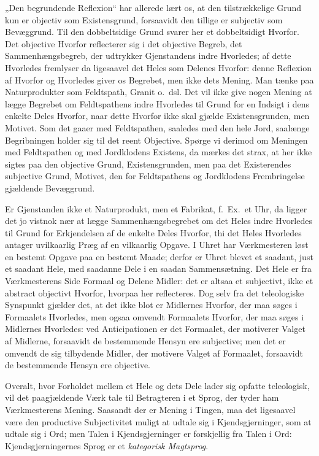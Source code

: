 \documentclass[12pt]{book}
\newcommand{\opage}[1]{\marginnote{\footnotesize\textit{[#1]}}}
\begin{document}
„Den begrundende Reflexion“ har allerede lært os, at den
tilstrækkelige Grund kun er objectiv som Existensgrund, forsaavidt
den tillige er subjectiv som Bevæggrund. Til den
dobbeltsidige Grund svarer her et dobbeltsidigt Hvorfor. Det
objective Hvorfor reflecterer sig i det objective Begreb, det
Sammenhængsbegreb, der udtrykker Gjenstandens indre Hvorledes;
af dette Hvorledes fremlyser da ligesaavel det Heles
som Delenes Hvorfor: denne Reflexion af Hvorfor og Hvorledes
giver os Begrebet, men ikke dets Mening. Man tænke
paa Naturprodukter som Feldtspath, Granit o.\ dsl. Det vil
ikke give nogen Mening at lægge Begrebet om Feldtspathens
indre Hvorledes til Grund for en Indsigt i dens enkelte Deles
Hvorfor, naar dette Hvorfor ikke skal gjælde Existensgrunden,
men Motivet. Som det gaaer med Feldtspathen, saaledes
med den hele Jord, saalænge Begribningen holder sig til det
reent Objective. Spørge vi derimod om Meningen med
Feldtspathen og med Jordklodens Existens, da mærkes det
strax, at her ikke sigtes paa den objective Grund, Existensgrunden,
men paa det Existerendes subjective Grund, Motivet,
den for Feldtspathens og Jordklodens Frembringelse gjældende
Bevæggrund.

Er Gjenstanden ikke et Naturprodukt, men et Fabrikat,
\opage{170}f.\ Ex.\ et Uhr, da ligger det jo vistnok nær at lægge Sammenhængsbegrebet
om det Heles indre Hvorledes til Grund for
Erkjendelsen af de enkelte Deles Hvorfor, thi det Heles
Hvorledes antager uvilkaarlig Præg af en vilkaarlig Opgave.
I Uhret har Værkmesteren løst en bestemt Opgave paa en
bestemt Maade; derfor er Uhret blevet et saadant, just et
saadant Hele, med saadanne Dele i en saadan Sammensætning.
Det Hele er fra Værkmesterens Side Formaal og Delene
Midler: det er altsaa et subjectivt, ikke et abstract objectivt
Hvorfor, hvorpaa her reflecteres. Dog selv fra det teleologiske
Synspunkt gjælder det, at det ikke blot er Midlernes Hvorfor,
der maa søges i Formaalets Hvorledes, men ogsaa omvendt
Formaalets Hvorfor, der maa søges i Midlernes Hvorledes:
ved Anticipationen er det Formaalet, der motiverer Valget af
Midlerne, forsaavidt de bestemmende Hensyn ere subjective;
men det er omvendt de sig tilbydende Midler, der motivere
Valget af Formaalet, forsaavidt de bestemmende Hensyn ere
objective.

Overalt, hvor Forholdet mellem et Hele og dets Dele
lader sig opfatte teleologisk, vil det paagjældende Værk tale
til Betragteren i et Sprog, der tyder ham Værkmesterens
Mening. Saasandt der er Mening i Tingen, maa det ligesaavel
være den productive Subjectivitet muligt at udtale sig
i Kjendsgjerninger, som at udtale sig i Ord; men Talen i
Kjendsgjerninger er forskjellig fra Talen i Ord: Kjendsgjerningernes
Sprog er et \emph{kategorisk Magtsprog}.
\end{document}
